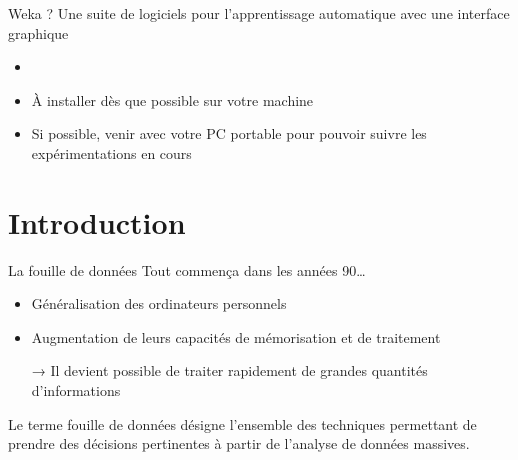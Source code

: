 \documentclass[hyperref={unicode}, xcolor={svgnames}, french]{beamer}
\begin{document}
\begin{frame}{Weka ?}
    Une suite de logiciels pour l'apprentissage automatique avec une interface graphique
    \begin{itemize}
        \item {}
        \item À installer dès que possible sur votre machine
        \item Si possible, venir avec votre PC portable pour pouvoir suivre les expérimentations en cours
    \end{itemize}
\end{frame}



\section*{Introduction}

\begin{frame}{La fouille de données}
    Tout commença dans les années 90…
    \begin{itemize}
        \item Généralisation des ordinateurs personnels
        \item Augmentation de leurs capacités de mémorisation et de traitement
        \item[→] Il devient possible de traiter rapidement de grandes quantités d'informations
    \end{itemize}
    Le terme \alert{fouille de données} désigne l'ensemble des techniques permettant de prendre des décisions pertinentes à partir de l'analyse de données massives.
\end{frame}
\end{document}
